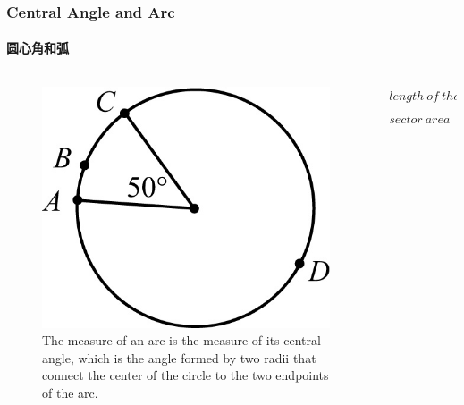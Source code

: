 \documentclass[
	11pt, %
]{beamer}
\begin{document}
\begin{frame}
\frametitle{Central Angle and Arc}
\framesubtitle{圆心角和弧}

\begin{columns}[t] 
		\begin{column}{0.4\textwidth} %
			\begin{figure}
				\includegraphics[width=\linewidth]{Central_Angle_Arc.jpg}
				\caption{The measure of an arc is the measure of its central angle, which is the
angle formed by two radii that connect the center of the circle to the two
endpoints of the arc.}
			\end{figure}

		\end{column}
		\begin{column}{0.6\textwidth} %
			\begin{equation*}
			\begin{aligned}
				length\ of \ the \ arc &= 2\pi r \frac{360}{central\ angle}\\
				sector\ area  &= \pi r^2 \frac{360}{central\ angle}
			\end{aligned}
			\end{equation*}
		\end{column}
	\end{columns}
\end{frame}

\end{document}
